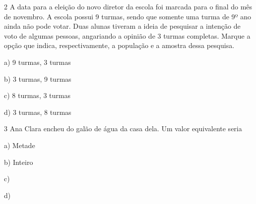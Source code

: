 \num{2} A data para a eleição do novo diretor da escola foi marcada para o
final do mês de novembro. A escola possui 9 turmas, sendo que somente
uma turma de 9º ano ainda não pode votar. Duas alunas tiveram a ideia de
pesquisar a intenção de voto de algumas pessoas, angariando a opinião de
3 turmas completas. Marque a opção que indica, respectivamente, a
população e a amostra dessa pesquisa.

a) 9 turmas, 3 turmas

b) 3 turmas, 9 turmas

c) 8 turmas, 3 turmas

d) 3 turmas, 8 turmas




\num{3} Ana Clara encheu  do galão de água da casa dela. Um
valor equivalente seria

a) Metade

b) Inteiro

c) 

d) 




